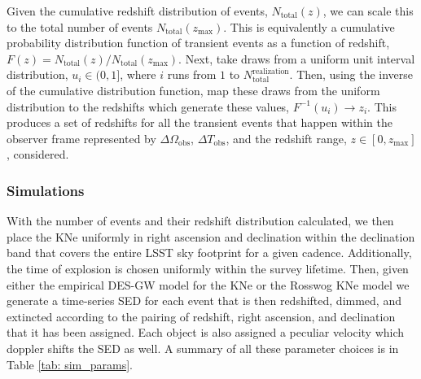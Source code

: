 Given the cumulative redshift distribution of events, $N_{\mathrm{total}}(z)$, we can scale this to the total number of events $N_{\mathrm{total}}(z_{\mathrm{max}})$. This is equivalently a cumulative probability distribution function of transient events as a function of redshift, $F(z) = N_{\mathrm{total}}(z)/ N_{\mathrm{total}}(z_{\mathrm{max}})$. Next, take draws from a uniform unit interval distribution, $u_i\in(0,1]$, where $i$ runs from $1$ to $N_{\mathrm{ total}}^{\mathrm{realization}}$. Then, using the inverse of the cumulative distribution function, map these draws from the uniform distribution to the redshifts which generate these values, $F^{-1}(u_i) \rightarrow z_i$. This produces a set of redshifts for all the transient events that happen within the observer frame represented by $\Delta \Omega_{\mathrm{obs}}$, $\Delta T_{\mathrm{obs}}$, and the redshift range, $z \in [0,z_{\mathrm{max}}]$, considered.\par

\subsubsection{Simulations}
With the number of events and their redshift distribution calculated, we then place the KNe uniformly in right ascension and declination within the declination band that covers the entire LSST sky footprint for a given cadence. Additionally, the time of explosion is chosen uniformly within the survey lifetime. Then, given either the empirical DES-GW model for the KNe or the Rosswog KNe model we generate a time-series SED for each event that is then redshifted, dimmed, and extincted according to the pairing of redshift, right ascension, and declination that it has been assigned. Each object is also assigned a peculiar velocity which doppler shifts the SED as well. A summary of all these parameter choices is in Table \ref{tab: sim_params}.\par

\begin{table}[h!]
\centering
{}
 \caption{The space of parameters that describe the population of KNe in the Rosswog semianalytic model.}\label{tab: sim_params}
\end{table}

